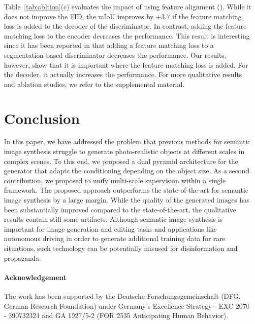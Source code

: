 \documentclass{bmvc2k}
\begin{document}
Table~\ref{tab:abltion}(c) evaluates the impact of using feature alignment (). 
While it does not improve the FID, the mIoU improves by +3.7 if the feature matching loss is added to the decoder of the discriminator. In contrast, adding the feature matching loss to the encoder decreases the performance. This result is interesting since it has been reported in \cite{schonfeld_sushko_iclr2021} that adding a feature matching loss to a segmentation-based discriminator decreases the performance. Our results, however, show that it is important where the feature matching loss is added. For the decoder, it actually increases the performance. For more qualitative results and ablation studies, we refer to the supplemental material.









\section{Conclusion}
\label{sec:conclusion}

In this paper, we have addressed the problem that previous methods for semantic image synthesis struggle to generate photo-realistic objects at different scales in complex scenes. To this end, we proposed a dual pyramid architecture for the generator that adapts the conditioning depending on the object size. As a second contribution, we proposed to unify multi-scale supervision within a single framework. The proposed approach outperforms the state-of-the-art for semantic image synthesis by a large margin. While the quality of the generated images has been substantially improved compared to the state-of-the-art, the qualitative results contain still some artifacts. Although semantic image synthesis is important for image generation and editing tasks and applications like autonomous driving in order to generate additional training data for rare situations, such technology can be potentially misused for disinformation and propaganda.  

\paragraph{Acknowledgement}
The work has been supported by the Deutsche Forschungsgemeinschaft (DFG, German Research Foundation) under Germany’s Excellence Strategy - EXC 2070 - 390732324 and GA 1927/5-2 (FOR 2535 Anticipating Human Behavior).






\end{document}
